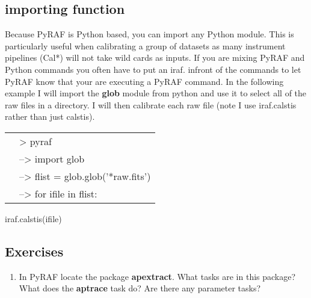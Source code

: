 \subsection{importing function}
Because PyRAF is Python based, you can import any Python module. This is particularly useful when calibrating a group of datasets as many instrument pipelines (Cal*) will not take wild cards as inputs.  If you are mixing PyRAF and Python commands you often have to put an iraf. infront of the commands to let PyRAF know that your are executing a PyRAF command. In the following example I will import the {\bf glob} module from python and use it to select all of the raw files in a directory. I will then calibrate each raw file (note I use iraf.calstis rather than just calstis).

\begin{minipage}{4in}
\setlength{\oddsidemargin}{0.25 in}
\setlength{\evensidemargin}{0.25 in}
\begin{tabular}{ll}
& {\color{RoyalBlue}> pyraf}\\
& {\color{RoyalBlue}--> import glob}\\
& {\color{RoyalBlue}--> flist = glob.glob('*raw.fits')}\\
& {\color{RoyalBlue}--> for ifile in flist:}\\
\end{tabular}
\setlength{\parindent}{0.5 in}

{\color{RoyalBlue}iraf.calstis(ifile)}\\
\end{minipage}

\subsection{Exercises}
\begin{enumerate}
\item In PyRAF locate the package {\bf apextract}. What tasks are in this package? What does the {\bf aptrace} task do? Are there any parameter tasks?
\end{enumerate}

